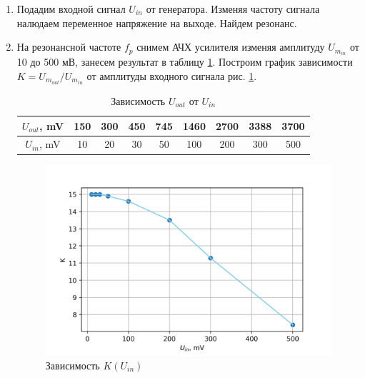 \documentclass[a4paper]{article}
\begin{document}
\begin{enumerate}
    \begin{center}
    \end{center}



    \item Подадим входной сигнал $U_{in}$ от генератора. Изменяя частоту сигнала налюдаем переменное напряжение на выходе. Найдем резонанс. \par
    \begin{center}
    \end{center} 

    \item На резонансной частоте $f_p$ снимем АЧХ усилителя изменяя амплитуду $U_{m_{in}}$ от 10 до 500 мВ, занесем результат в таблицу \ref{t1}. Построим график зависимости 
    $K = U_{m_{out}}/ U_{m_{in}}$ от амплитуды входного сигнала рис. \ref{gr1}.

    \begin{table}[H]
        \centering
        \begin{center}
        \end{center}
        \vspace{0.1cm}
        \begin{tabular}{|c|c|c|c|c|c|c|c|c|}
            \hline
            $U_{out}$, mV  & 150  & 300&450 & 745& 1460& 2700&3388 & 3700  \\ 
            \hline
            $U_{in}$, mV   & 10 &  20 &  30 &50& 100&200 & 300 &  500  \\
            \hline
            \end{tabular}
            \caption{Зависимость $U_{out}$  от $U_{in}$}
            \label{t1}
    \end{table}

    \begin{figure}[H]
        \begin{center}
            \includegraphics[scale = 1]{gr1.png}
            \caption{Зависимость $K(U_{in})$}
            \label{gr1}
        \end{center}
    \end{figure}



\end{enumerate}
\end{document}
